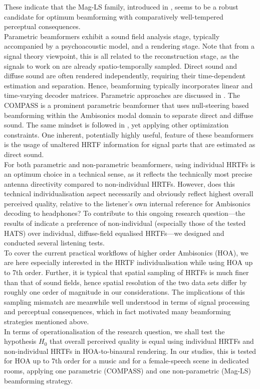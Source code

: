 \documentclass[conference]{IEEEtran}
\def\NewL{\\\noindent\hspace*{5mm}}
\begin{document}
%
These indicate that the Mag-LS family, introduced in \cite{Schoerkhuber2018_MagLS, Deppisch2021}, seems to be a robust candidate for optimum beamforming with comparatively well-tempered perceptual consequences.
%
\NewL Parametric beamformers exhibit a sound field analysis stage, typically accompanied by a psychoacoustic model, and a rendering stage.
%
Note that from a signal theory viewpoint, this is all related to the reconstruction stage, as the signals to work on are already spatio-temporally sampled.
%
Direct sound and diffuse sound are often rendered independently, requiring their time-dependent estimation and separation.
%
Hence, beamforming typically incorporates linear and time-varying decoder matrices.
%
Parametric approaches are discussed in \cite{Politis2016_diss, Politis2017_Waspaa, Politis2018_Compass, Schoerkhuber2019, McCormack2019_EAA}.
%
The COMPASS \cite{Politis2018_Compass} is a prominent parametric beamformer that uses null-steering based beamforming within the Ambisonics modal domain to separate direct and diffuse sound.
%
The same mindset is followed in \cite{Schoerkhuber2019}, yet applying other optimization constraints.
%
One inherent, potentially highly useful, feature of these beamformers is the usage of unaltered HRTF information for signal parts that are estimated as direct sound.
%
\NewL For both parametric and non-parametric beamformers, using individual HRTFs is an optimum choice in a technical sense, as it reflects the technically most precise antenna directivity compared to non-individual HRTFs.
%
However, does this technical individualisation aspect necessarily and obviously reflect highest overall perceived quality, relative to the listener's own internal reference for Ambisonics decoding to headphones?
%
To contribute to this ongoing research question---the results of \cite{Armstrong2018} indicate a preference of non-individual (especially those of the tested HATS) over individual, diffuse-field equalised HRTFs---we designed and conducted several listening tests.
%
\NewL To cover the current practical workflows of higher order Ambisonics (HOA), we are here especially interested in the HRTF individualisation while using HOA up to 7th order.
%
Further, it is typical that spatial sampling of HRTFs is much finer than that of sound fields, hence spatial resolution of the two data sets differ by roughly one order of magnitude in our considerations.
%
The implications of this sampling mismatch are meanwhile well understood in terms of signal processing and perceptual consequences, which in fact motivated many beamforming strategies mentioned above.
%
\NewL In terms of operationalisation of the research question, we shall test the hypothesis $H_0$ that overall perceived quality is equal using individual HRTFs and
non-individual HRTFs in HOA-to-binaural rendering.
%
In our studies, this is tested for HOA up to 7th order for a music and for a female-speech scene in dedicated rooms, applying %
one parametric (COMPASS) and one non-parametric (Mag-LS) beamforming strategy.
\end{document}
